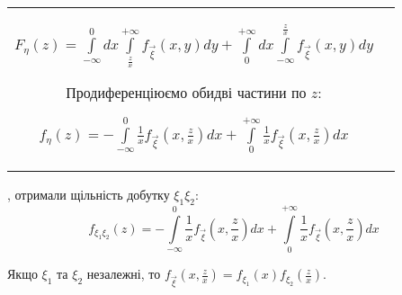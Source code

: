 \begin{enumerate}
\begin{tabular}{c p{8.8cm}}
    $F_\eta(z) = \int\limits_{-\infty}^0 dx \int\limits_{\frac{z}{x}}^{+\infty} 
    f_{\vec{\xi}}(x, y)dy + \int\limits_0^{+\infty}dx\int\limits_{-\infty}^{\frac{z}{x}} 
    f_{\vec{\xi}}(x, y) dy$
    
    Продиференціюємо обидві частини по $z$:

    $f_\eta(z) = - \int\limits_{-\infty}^0 \frac{1}{x} f_{\vec{\xi}}\left(x, \frac{z}{x}\right)dx 
    + \int\limits_0^{+\infty}\frac{1}{x}f_{\vec{\xi}}\left(x, \frac{z}{x}\right)dx$

\end{tabular}
\end{enumerate}

\vspace{0.5em}
, отримали щільність добутку $\xi_1 \xi_2$:
\begin{equation}\label{eq:distr_product}
    f_{\xi_1 \xi_2}(z) = -\int\limits_{-\infty}^0 \frac{1}{x}f_{\vec{\xi}}\left(x, \frac{z}{x}\right)dx + 
    \int\limits_0^{+\infty}\frac{1}{x}f_{\vec{\xi}}\left(x, \frac{z}{x}\right)dx
\end{equation}

\begin{remark}
    Якщо $\xi_1$ та $\xi_2$ незалежні, то $f_{\vec{\xi}}\left(x, \frac{z}{x}\right) = 
    f_{\xi_1}(x)f_{\xi_2}\left(\frac{z}{x}\right)$.
\end{remark}


